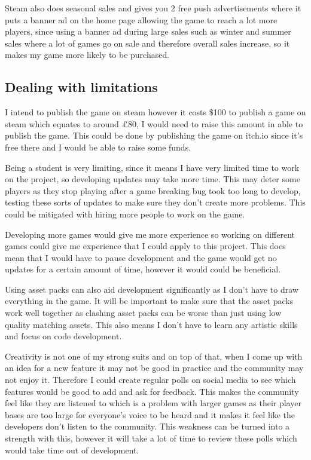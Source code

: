 \documentclass{article}
\newcommand{\parBr}{\vspace{5mm}}%
\begin{document}
Steam also does seasonal sales and gives you 2 free push advertisements where it puts a banner ad on the home page allowing the game to reach a lot more players, since using a banner ad during large sales such as winter and summer sales where a lot of games go on sale and therefore overall sales increase, so it makes my game more likely to be purchased.

\subsection{Dealing with limitations}
I intend to publish the game on steam however it costs \$100 to publish a game on steam which equates to around £80, I would need to raise this amount in able to publish the game. This could be done by publishing the game on itch.io since it's free there and I would be able to raise some funds.

\parBr

Being a student is very limiting, since it means I have very limited time to work on the project, so developing updates may take more time. This may deter some players as they stop playing after a game breaking bug took too long to develop, testing these sorts of updates to make sure they don't create more problems. This could be mitigated with hiring more people to work on the game. 

\parBr

Developing more games would give me more experience so working on different games could give me experience that I could apply to this project. This does mean that I would have to pause development and the game would get no updates for a certain amount of time, however it would could be beneficial. 

\parBr

Using asset packs can also aid development significantly as I don't have to draw everything in the game. It will be important to make sure that the asset packs work well together as clashing asset packs can be worse than just using low quality matching assets. This also means I don't have to learn any artistic skills and focus on code development.

\parBr

Creativity is not one of my strong suits and on top of that, when I come up with an idea for a new feature it may not be good in practice and the community may not enjoy it. Therefore I could create regular polls on social media to see which features would be good to add and ask for feedback. This makes the community feel like they are listened to which is a problem with larger games as their player bases are too large for everyone's voice to be heard and it makes it feel like the developers don't listen to the community. This weakness can be turned into a strength with this, however it will take a lot of time to review these polls which would take time out of development.
\end{document}
